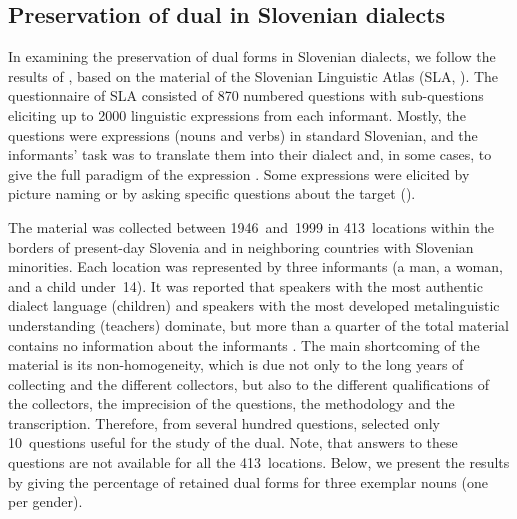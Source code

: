\documentclass[output=paper,colorlinks,citecolor=brown]{langscibook}
\begin{document}
\ea \label{pav:ex:4}
 \label{pav:ex:4a}
 \label{pav:ex:4b}
\z
\z		

\subsection{Preservation of dual in Slovenian dialects}\label{pav:sec:slovenian-dialects}
In examining the preservation of dual forms in Slovenian dialects, we follow the results of \citet{Jakop2008}, based on the material of the Slovenian Linguistic Atlas (SLA, \citealt[15]{Benedik1999}). The questionnaire of SLA consisted of 870 numbered questions with sub-questions eliciting up to 2000 linguistic expressions from each informant. Mostly, the questions were expressions (nouns and verbs) in standard Slovenian, and the informants' task was to translate them into their dialect and, in some cases, to give the full paradigm of the expression \citep[15]{Benedik1999}. Some expressions were elicited by picture naming or by asking specific questions about the target (). 

The material was collected between 1946~and~1999 in 413~locations within the borders of present-day Slovenia and in neighboring countries with Slovenian minorities. Each location was represented by three informants (a man, a woman, and a child under~14). It was reported that speakers with the most authentic dialect language (children) and speakers with the most developed metalinguistic understanding (teachers) dominate, but more than a quarter of the total material contains no information about the informants \citep[154]{KendaJez2002}. The main shortcoming of the material is its non-homogeneity, which is due not only to the long years of collecting and the different collectors, but also to the different qualifications of the collectors, the imprecision of the questions, the methodology and the transcription. Therefore, from several hundred questions, \citet{Jakop2008} selected only 10~questions useful for the study of the dual. Note, that answers to these questions are not available for all the 413~locations. Below, we present the results by giving the percentage of retained dual forms for three exemplar nouns (one per gender).
\end{document}

